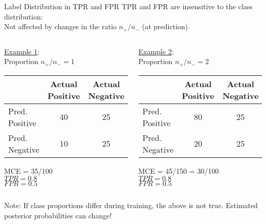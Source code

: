 \documentclass[11pt,compress,t,notes=noshow, xcolor=table]{beamer}
\begin{document}
\begin{vbframe}{Label Distribution in TPR and FPR}
TPR and FPR are insensitive to the class distribution:\\
Not affected by changes in the ratio $n_+/n_-$ (at prediction).\\

\begin{columns}
\begin{column}{0.45\textwidth}

\underline{Example 1}:\\
Proportion $n_+/n_- = 1$\\

\lz

{
\tiny
\centering
\tiny
\begin{tabular}{|l|c|c|}
                \hline
               & Actual Positive & Actual Negative \\ \hline
Pred. Positive & 40            & 25            \\ \hline
Pred. Negative & 10            & 25           \\ \hline
\end{tabular}
}
 
\lz 

MCE = 35/100\\
$TPR = 0.8$\\ 
$FPR = 0.5$ 

\end{column}
\begin{column}{0.45\textwidth} 

\underline{Example 2}:\\
Proportion $n_+/n_- = 2$\\

\lz

{
\tiny
\begin{tabular}{|l|c|c|}
                \hline
               & Actual Positive & Actual Negative \\ \hline
Pred. Positive & 80            & 25            \\ \hline
Pred. Negative & 20            & 25           \\ \hline
\end{tabular}
}
 
\lz 
 
MCE = 45/150 = 30/100\\
$TPR = 0.8$\\ 
$FPR = 0.5$ 
\end{column}
\end{columns}



\lz

Note: If class proportions differ during training, the above is not true. Estimated posterior probabilities can change!

\end{vbframe}
\end{document}
